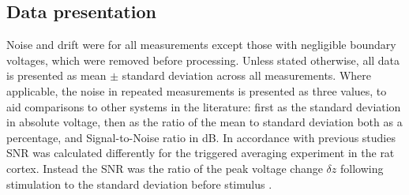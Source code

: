 \subsection{Data presentation}

Noise and drift were for all measurements except those with negligible boundary voltages, which were removed before processing. Unless stated otherwise, all data is presented as mean $\pm$ standard deviation across all measurements. Where applicable, the noise in repeated measurements is presented as three values, to aid comparisons to other systems in the literature: first as the standard deviation in absolute voltage, then as the ratio of the mean to standard deviation both as a percentage, and Signal-to-Noise ratio in dB. In accordance with previous studies SNR was calculated differently for the triggered averaging experiment in the rat cortex. Instead the SNR was the ratio of the peak voltage change $\delta z$ following stimulation to the standard deviation before stimulus \cite{Oh2011}. 
